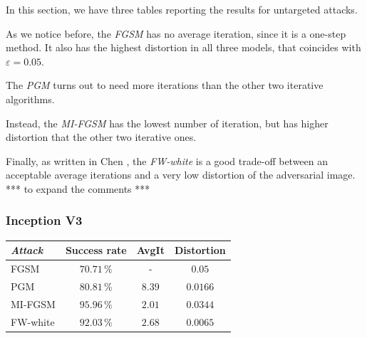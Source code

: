 \documentclass[10pt,twocolumn,letterpaper, english]{article}
\theoremstyle{definition}
\theoremstyle{plain}
\theoremstyle{plain}
\theoremstyle{plain}
\theoremstyle{plain}
\theoremstyle{remark}
\theoremstyle{remark}
\theoremstyle{definition}
\theoremstyle{definition}
\theoremstyle{definition}
\theoremstyle{definition}
\renewcommand{\epsilon}{\varepsilon}
\begin{document}

 


In this section, we have three tables reporting the results for untargeted attacks. 

As we notice before, the \textit{FGSM} has no average iteration, since it is a one-step method. 
It also has the highest distortion in all three models, that coincides with $\epsilon = 0.05$. 

The \textit{PGM} turns out to need more iterations than the other two iterative algorithms. 

Instead, the \textit{MI-FGSM} has the lowest number of iteration, but has higher distortion that the other two iterative ones. 

Finally, as written in Chen \cite{frank}, the \textit{FW-white} is a good trade-off between an acceptable average iterations and a very low distortion of the adversarial image. \\

*** to expand the comments *** 

\subsubsection{Inception V3}

\begin{center}

\begin{tabular}{ |l|c|c|c| }
 \hline
  \textit{Attack} & Success rate & AvgIt & Distortion \\
 \hline
 
 FGSM   & $70.71\,\%$   &  - & $0.05$\\
 PGM&   $80.81\,\%$  & $8.39$  & $0.0166$ \\
 MI-FGSM & $95.96\,\%$ & $2.01$ & $0.0344$\\
 FW-white & $92.03\,\%$ & $2.68$ & $0.0065$\\
\hline
\end{tabular}
\end{center}
\end{document}
